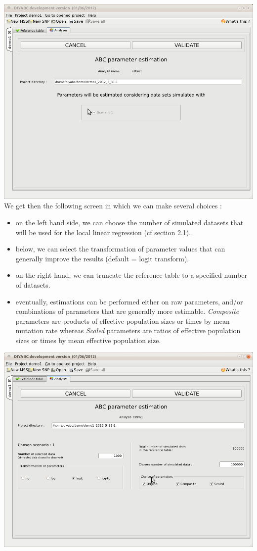 \includegraphics[scale=0.35]{gui_pictures/Capture-DIYABC-35.png} \\
 
We get then the following screen in which we can make several choices :
\begin{itemize}
 \item on the left hand side, we can choose the number of simulated datasets that will be used for the local linear regression (cf section 2.1).
 \item below, we can select the transformation of parameter values that can generally improve the results (default = logit transform).
 \item on the right hand, we can truncate the reference table to a specified number of datasets.
 \item eventually, estimations can be performed either on raw parameters, and/or combinations of parameters that are generally more estimable. \emph{Composite} parameters are products of effective population sizes or times by mean mutation rate whereas \emph{Scaled} parameters are ratios of effective population sizes or times by mean effective population size. 
\end{itemize}

\includegraphics[scale=0.35]{gui_pictures/Capture-DIYABC-36.png} \\
 
